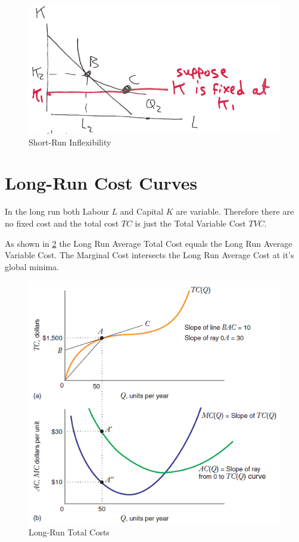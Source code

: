\documentclass[../ECON-281-Notes.tex]{subfiles}
\begin{document}
\begin{figure}[!h]
    \centering
    \includegraphics[width=\columnwidth]{../assets/SR_inflex.png}   
    \caption{Short-Run Inflexibility}
    \label{fig:SR_inflex}
\end{figure}

\newpage

\section{Long-Run Cost Curves}
In the long run both Labour \(L\) and Capital \(K\) are variable. Therefore there are no fixed cost and the total cost \(TC\) is just the Total Variable Cost \(TVC\).

As shown in \cref{fig:LRTC} the Long Run Average Total Cost equals the Long Run Average Variable Cost. The Marginal Cost intersects the Long Run Average Cost at it's global  minima. 
\begin{figure}[h]
    \centering
    \includegraphics[width=\columnwidth]{../assets/LRTC.png}   
    \caption{Long-Run Total Costs}
    \label{fig:LRTC}
\end{figure}
\end{document}
